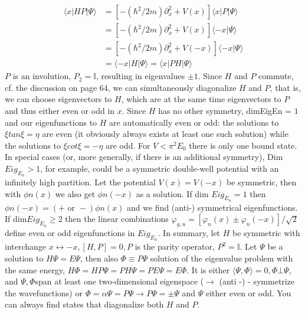 \begin{equation}
\begin{aligned}\langle x|H P| \Psi\rangle &=\left[-\left(\hbar^{2} / 2 m\right) \partial_{x}^{2}+V(x)\right]\langle x|P| \Psi\rangle \\ &=\left[-\left(\hbar^{2} / 2 m\right) \partial_{x}^{2}+V(x)\right]\langle- x | \Psi\rangle \\ &=\left[-\left(\hbar^{2} / 2 m\right) \partial_{x}^{2}+V(-x)\right]\langle- x | \Psi\rangle \\
&=\langle- x|H| \Psi\rangle=\langle x|P H| \Psi\rangle
\end{aligned}
\end{equation}
$P$ is an involution, $P_2 = \mathbb{I}$, resulting in eigenvalues $\pm 1$. Since $H$ and $P$ commute, cf. the discussion on page 64, we can simultaneously diagonalize $H$ and $P$, that is, we can choose eigenvectors to $H$, which are at the same time eigenvectors to $P$ and thus either even or odd in $x$. Since $H$ has no other symmetry, dimEigEn = $1$ and our eigenfunctions to $H$ are automatically even or odd: the solutions to $\xi tan \xi= \eta$ are even (it obviously always exists at least one such solution) while the solutions to $\xi cot\xi = -\eta$ are odd. For $V <\pi^2E_0$ there is only one bound state. In special cases (or, more generally, if there is an additional symmetry), Dim $Eig_{E_n}> 1$, for example, could be a symmetric double-well potential with an infinitely high partition. Let the potential $V (x) = V (-x)$ be symmetric, then with $\phi n (x)$ we also get $\phi n (-x)$ as a solution. If dim $Eig_{E_n} = 1$ then $\phi n (-x) = (+ \text{ or } -) \phi n (x)$ and we find (anti-) symmetrical eigenfunctions. If dim$Eig_{E_n} ≥ 2$ then the linear combinations $\varphi_{g, u} = [\varphi_n (x) \pm \varphi_n (-x)] / \sqrt{2}$ define even or odd eigenfunctions in $Eig_{E_n}$.
In summary, let $H$ be symmetric with interchange $x \longleftrightarrow -x, [H, P] = 0, P$ is the parity operator, $P^2 = \mathbb{I}$. Let $\Psi$ be a solution to $H\Psi = E\Psi$, then also $\Phi\equiv P\Psi$ solution of the eigenvalue problem with the same energy, $H\Phi = HP\Psi = P H\Psi = P E\Psi = E\Phi$. It is either $\langle\Psi,\Phi\rangle = 0, \Phi ⊥ \Psi$, and $\Psi, \Phi $span at least one two-dimensional eigenspace ($\to$ (anti -) - symmetrize the wavefunctions) or $\Phi = \alpha\Psi=P\Psi\to P\Psi=\pm\Psi$ and $\Psi$ either even or odd. You can always find states that diagonalize both $H$ and $P$.
